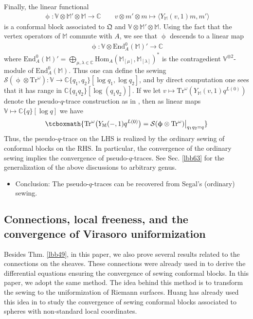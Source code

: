 \documentclass[11pt,b5paper,notitlepage]{article}
\theoremstyle{definition}
\theoremstyle{plain}
\newcommand{\Tr}{\mathrm{Tr}}
\newcommand{\End}{\mathrm{End}} %
\newcommand{\Hom}{\mathrm{Hom}}
\newcommand{\blt}{\bullet}
\newcommand{\Vbb}{\mathbb V}
\newcommand{\Mbb}{\mathbb M}
\newcommand{\Cbb}{\mathbb C}
\newcommand{\<}{\left\langle}
\renewcommand{\>}{\right\rangle}
\newcommand{\fx}{\mathfrak{X}}
\newcommand{\MD}{\mathcal{D}}
\newcommand{\MS}{\mathcal{S}}
\newcommand{\bk}[1]{\langle {#1}\rangle}
\newcommand{\fq}{{\mathfrak Q}}
\numberwithin{equation}{subsection}
\begin{document}
Finally, the linear functional
\begin{align*}
\upphi:\Vbb\otimes \Mbb'\otimes\Mbb\rightarrow\Cbb\qquad v\otimes m'\otimes m\mapsto\bk{Y_\Mbb(v,1)m,m'}
\end{align*}
is a conformal block associated to $\fq$ and $\Vbb\otimes\Mbb'\otimes\Mbb$. Using the fact that the vertex operators of $\Mbb$ commute with $A$, we see that $\upphi$ descends to a linear map
\begin{align*}
\upphi:\Vbb\otimes\End^0_A(\Mbb)'\rightarrow\Cbb
\end{align*}
where $\End^0_A(\Mbb)'=\bigoplus_{\mu,\lambda\in\Cbb}\Hom_A(\Mbb_{[\mu]},\Mbb_{[\lambda]})^*$ is the contragedient $\Vbb^{\otimes2}$-module of $\End^0_A(\Mbb)$. %
Thus one can define the sewing $\MS(\upphi\otimes\Tr^\omega):\Vbb\rightarrow\Cbb\{q_1,q_2\}[\log q_1,\log q_2]$, and by direct computation one sees that it has range in $\Cbb\{q_1q_2\}[\log(q_1q_2)]$. If we let $v\mapsto\Tr^\omega(Y_\Mbb(v,1)q^{L(0)})$ denote the pseudo-$q$-trace construction as in \cite{Miy-modular-invariance,AN-pseudo-trace,Fio-genus-1,Hua-modular-C2}, then as linear maps $\Vbb\mapsto\Cbb\{q\}[\log q]$ we have
\begin{align}
\tcboxmath{\Tr^\omega \big(Y_\Mbb(-,1)q^{L(0)}\big)=\MS(\upphi\otimes\Tr^\omega)\big|_{q_1q_2=q}}
\end{align}
Thus, the pseudo-$q$-trace on the LHS is realized by the ordinary sewing of conformal blocks on the RHS. In particular, the convergence of the ordinary sewing implies the convergence of pseudo-$q$-traces. See Sec. \ref{lbb63} for the generalization of the above discussions to arbitrary genus.

\begin{itemize}
\item Conclusion: The pseudo-$q$-traces can be recovered from Segal's (ordinary) sewing.
\end{itemize}




\subsection{Connections, local freeness, and the convergence of Virasoro uniformization}


Besides Thm. \ref{lbb49}, in this paper, we also prove several results related to the connections on the sheaves. These connections were already used in \cite{Gui-sewingconvergence} to derive the differential equations ensuring the convergence of sewing conformal blocks. In this paper, we adopt the same method. The idea behind this method is to transform the sewing to the uniformization of Riemann surfaces. Huang has already used this idea in \cite{Hua97} to study the convergence of sewing conformal blocks associated to spheres with non-standard local coordinates. 
\end{document}
